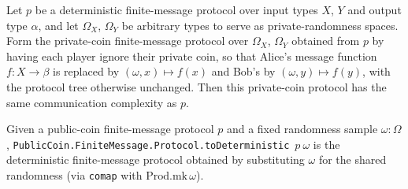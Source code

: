 \begin{theorem}
\label{CommunicationComplexity.Deterministic.FiniteMessage.Protocol.toPrivateCoin_complexity}
\leanok
{}
Let $p$ be a deterministic finite-message protocol over input types $X$, $Y$ and output
type $\alpha$, and let $\Omega_X$, $\Omega_Y$ be arbitrary types to serve as
private-randomness spaces. Form the private-coin finite-message protocol over
$\Omega_X$, $\Omega_Y$ obtained from $p$ by having each player ignore their private
coin, so that Alice's message function $f : X \to \beta$ is replaced by $(\omega, x)
\mapsto f(x)$ and Bob's by $(\omega, y) \mapsto f(y)$, with the protocol tree otherwise
unchanged. Then this private-coin protocol has the same communication complexity as $p$.
\end{theorem}

\begin{definition}
\label{CommunicationComplexity.PublicCoin.FiniteMessage.Protocol.toDeterministic}
\leanok
{}
Given a public-coin finite-message protocol $p$ and a fixed randomness sample
$\omega : \Omega$, \texttt{PublicCoin.FiniteMessage.Protocol.toDeterministic}~$p~\omega$
is the deterministic finite-message protocol obtained by substituting $\omega$
for the shared randomness (via \texttt{comap} with $\mathrm{Prod.mk}\,\omega$).
\end{definition}

